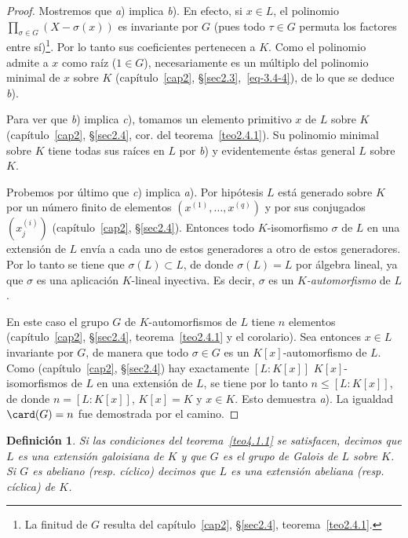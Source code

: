 \documentclass[oneside,bibtotoc,leqno,spanish]{amsbook}
\newcommand{\QED}{}%
\numberwithin{equation}{section}
\theoremstyle{defi}
\newtheorem{definition}{Definici\'on}
\theoremstyle{note}
\theoremstyle{rem}
\numberwithin{theorem}{section}
\numberwithin{proposition}{section}
\numberwithin{definition}{section}
\numberwithin{lemma}{section}
\numberwithin{corollary}{section}
\numberwithin{example}{section}
\numberwithin{footnote}{section}%
\begin{document}
\begin{proof}
Mostremos que {\itshape a}) implica {\itshape b}). En efecto, si $x\in L$, el polinomio
$\prod_{\sigma\in G}(X-\sigma(x))$ es invariante por $G$ (pues todo $\tau\in G$ permuta los factores
entre s\'i)\footnote{La finitud de $G$ resulta del cap\'itulo~\ref{cap2}, \S\ref{sec2.4}, teorema~\ref{teo2.4.1}.}. Por lo tanto
sus coeficientes pertenecen a $K$. Como el polinomio admite a $x$ como ra\'iz ($1\in G$), necesariamente
es un m\'ultiplo del polinomio minimal de $x$ sobre $K$ (cap\'itulo~\ref{cap2}, \S\ref{sec2.3},~\eqref{eq-3.4-4}), de
lo que se deduce {\itshape b}).

Para ver que \textit{b}) implica {\itshape c}), tomamos un elemento primitivo $x$ de $L$ sobre $K$
(cap\'itulo~\ref{cap2}, \S\ref{sec2.4}, cor. del teorema~\ref{teo2.4.1}). Su polinomio minimal sobre $K$ tiene todas sus ra\'ices en
$L$ por {\itshape b}) y evidentemente \'estas general $L$ sobre $K$.

Probemos por \'ultimo que {\itshape c}) implica {\itshape a}). Por hip\'otesis $L$ est\'a generado sobre $K$
por un n\'umero finito de elementos $(x^{(1)},\dots,x^{(q)})$ y por sus conjugados $(x_{j}^{(i)})$
(cap\'itulo~\ref{cap2}, \S\ref{sec2.4}). Entonces todo $K$-isomorfismo $\sigma$ de $L$ en una extensi\'on de $L$
env\'ia a cada uno de estos generadores a otro de estos generadores. Por lo tanto se tiene que $\sigma(L)\subset L$,
de donde $\sigma(L) =L$ por \'algebra lineal, ya que $\sigma$ es una aplicaci\'on $K$-lineal inyectiva. Es decir,
$\sigma$ es un {\em $K$-automorfismo} de $L$.

En este caso el grupo $G$ de $K$-automorfismos de $L$ tiene $n$ elementos (cap\'itulo~\ref{cap2}, \S\ref{sec2.4}, teorema~\ref{teo2.4.1} y
el corolario). Sea entonces $x\in L$ invariante por $G$, de manera que todo $\sigma\in G$ es un $K[x]$-automorfismo
de $L$. Como (cap\'itulo~\ref{cap2}, \S\ref{sec2.4}) hay exactamente $[L:K[x]]$ $K[x]$-isomorfismos de $L$ en una
extensi\'on de $L$, se tiene por lo tanto $n\leq[L:K[x]]$, de donde $n=[L:K[x]]$, $K[x] = K$ y
$x\in K$. Esto demuestra {\itshape a}). La igualdad $\card(G) = n$ fue demostrada por el camino. \QED
\end{proof}

\begin{definition}
Si las condiciones del teorema~\ref{teo4.1.1} se satisfacen, decimos que $L$ es una extensi\'on galoisiana de $K$ y que
$G$ es el grupo de Galois de $L$ sobre $K$. Si $G$ es abeliano (resp. c\'iclico) decimos que $L$ es una
extensi\'on abeliana (resp. c\'iclica) de $K$.
\end{definition}
\end{document}
